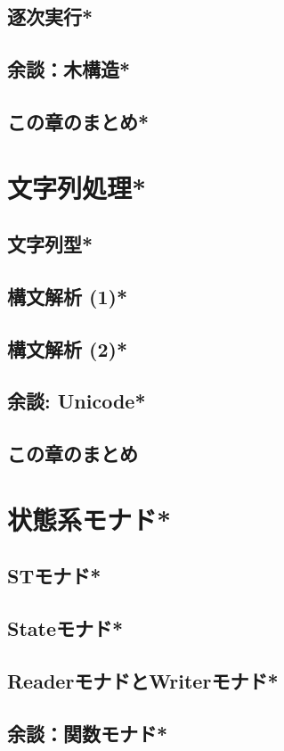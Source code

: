 \documentclass[a4paper,twocolumn]{jsbook}
\begin{document}
\section{逐次実行*}
\section{余談：木構造*}
\section{この章のまとめ*}

\chapter{文字列処理*}
\section{文字列型*}
\section{構文解析 (1)*}
\section{構文解析 (2)*}
\section{余談: Unicode*}
\section{この章のまとめ}

\chapter{状態系モナド*}
\section{STモナド*}
\section{Stateモナド*}
\section{ReaderモナドとWriterモナド*}
\section{余談：関数モナド*}
\end{document}
